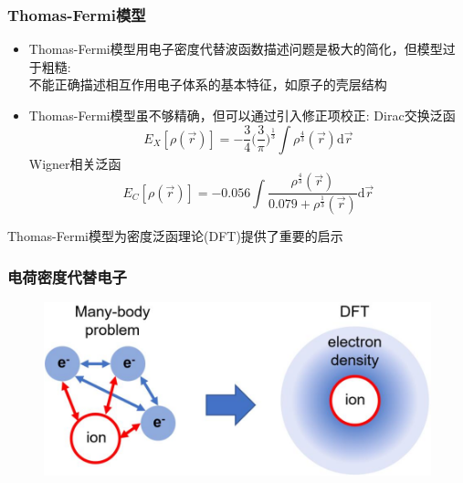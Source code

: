 \frame
{
	\frametitle{\textrm{Thomas-Fermi}模型}
	\begin{itemize}
		\item \textrm{Thomas-Fermi}模型用电子密度代替波函数描述问题是极大的简化，但模型过于粗糙:\\
			不能正确描述相互作用电子体系的基本特征，如原子的壳层结构
		\item \textrm{Thomas-Fermi}模型虽不够精确，但可以通过引入修正项校正:
			\textrm{Dirac}交换泛函 $$E_X[\rho(\vec r)]=-\dfrac34\bigg(\dfrac3{\pi}\bigg)^{\frac13}\int\rho^{\frac43}(\vec r)\mathrm{d}\vec r$$
			\textrm{Wigner}相关泛函 $$E_C[\rho(\vec r)]=-0.056\int\dfrac{\rho^{\frac43}(\vec r)}{0.079+\rho^{\frac13}(\vec r)}\mathrm{d}\vec r$$
	\end{itemize}
	\textrm{Thomas-Fermi}模型为密度泛函理论\textrm{(DFT)}提供了重要的启示
}

\frame
{
	\frametitle{电荷密度代替电子}
\begin{figure}[h!]
\centering
\vspace{3.5pt}
\includegraphics[height=0.45\textwidth,width=1.0\textwidth,viewport=0 0 950 440,clip]{Figures/Schematic-illustration-of-transforming-many_electron-system-to-electron-density.png}
\caption{\fontsize{6.0pt}{4.5pt}}
\label{Density-Particle}
\end{figure}
}

